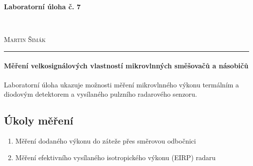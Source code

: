 \documentclass[11pt,a4paper]{article}
\begin{document}

\begin{center}
    {\LARGE\textbf{Laboratorní úloha č. 7}}\\[3mm]
    \begin{minipage}{0.4\textwidth}
        \begin{flushleft}
            \textsc{}
        \end{flushleft}
    \end{minipage}
    ~
    \begin{minipage}{0.4\textwidth}
        \begin{flushright}
            \textsc{Martin Šimák}
        \end{flushright}
    \end{minipage}
    \noindent\rule{14.5cm}{0.4pt}
\end{center}

\paragraph*{Měření velkosignálových vlastností mikrovlnných směšovačů a násobičů} Laboratorní úloha ukazuje možnosti měření mikrovlnného výkonu termálním a diodovým detektorem a vysílaného pulzního radarového senzoru.

\subsection*{Úkoly měření}
\begin{enumerate}
    \item Měření dodaného výkonu do záteže přes směrovou odbočnici
    \item Měření efektivního vysílaného isotropického výkonu (EIRP) radaru
\end{enumerate}
\end{document}
